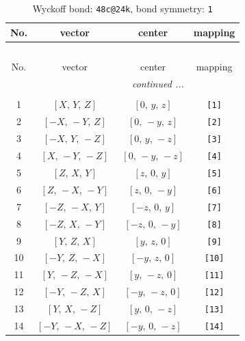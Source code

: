 \documentclass[fleqn,8pt]{jsarticle}
\begin{document}
\begin{longtable}{cccc}
\caption{Wyckoff bond: {\tt 48c@24k}, bond symmetry: {\tt 1}}
 \\
 \hline \hline
No. & vector & center & mapping \\ \hline \endfirsthead

\multicolumn{3}{l}{\tablename\ \thetable{}} \\
 \hline \hline
No. & vector & center & mapping \\ \hline \endhead

 \hline \hline
\multicolumn{3}{r}{\footnotesize\it continued ...} \\ \endfoot

 \hline \hline
\multicolumn{3}{r}{} \\ \endlastfoot

1 & $\left[ X,\, Y,\, Z \right]$ & $\left[ 0,\, y,\, z \right]$ & {\tt [1]} \\ \hline
2 & $\left[ - X,\, - Y,\, Z \right]$ & $\left[ 0,\, - y,\, z \right]$ & {\tt [2]} \\ \hline
3 & $\left[ - X,\, Y,\, - Z \right]$ & $\left[ 0,\, y,\, - z \right]$ & {\tt [3]} \\ \hline
4 & $\left[ X,\, - Y,\, - Z \right]$ & $\left[ 0,\, - y,\, - z \right]$ & {\tt [4]} \\ \hline
5 & $\left[ Z,\, X,\, Y \right]$ & $\left[ z,\, 0,\, y \right]$ & {\tt [5]} \\ \hline
6 & $\left[ Z,\, - X,\, - Y \right]$ & $\left[ z,\, 0,\, - y \right]$ & {\tt [6]} \\ \hline
7 & $\left[ - Z,\, - X,\, Y \right]$ & $\left[ - z,\, 0,\, y \right]$ & {\tt [7]} \\ \hline
8 & $\left[ - Z,\, X,\, - Y \right]$ & $\left[ - z,\, 0,\, - y \right]$ & {\tt [8]} \\ \hline
9 & $\left[ Y,\, Z,\, X \right]$ & $\left[ y,\, z,\, 0 \right]$ & {\tt [9]} \\ \hline
10 & $\left[ - Y,\, Z,\, - X \right]$ & $\left[ - y,\, z,\, 0 \right]$ & {\tt [10]} \\ \hline
11 & $\left[ Y,\, - Z,\, - X \right]$ & $\left[ y,\, - z,\, 0 \right]$ & {\tt [11]} \\ \hline
12 & $\left[ - Y,\, - Z,\, X \right]$ & $\left[ - y,\, - z,\, 0 \right]$ & {\tt [12]} \\ \hline
13 & $\left[ Y,\, X,\, - Z \right]$ & $\left[ y,\, 0,\, - z \right]$ & {\tt [13]} \\ \hline
14 & $\left[ - Y,\, - X,\, - Z \right]$ & $\left[ - y,\, 0,\, - z \right]$ & {\tt [14]} \\ \hline

\end{longtable}
\end{document}
